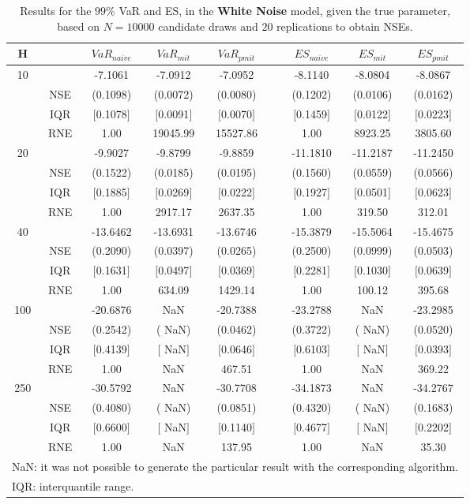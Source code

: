 \footnotesize{  
{ \renewcommand{\arraystretch}{1.3} 
\begin{longtable}{ccccccccc}  
\caption{Results for the $99\%$ VaR and ES, in the \textbf{White Noise} model, given the true parameter, based on $N=10000$ candidate draws and $20$ replications to obtain NSEs.} 
\label{tab:res_algos_WN_ML} \\ 
 H & & $VaR_{naive}$ & $VaR_{mit}$ & $VaR_{pmit}$ &  & $ES_{naive}$ & $ES_{mit}$ & $ES_{pmit}$ \\ \hline 
10 & & -7.1061 & -7.0912 & -7.0952 & & -8.1140 & -8.0804 & -8.0867  \\ 
  & NSE & (0.1098) & (0.0072) & (0.0080) & & (0.1202) & (0.0106) & (0.0162)   \\ 
 & IQR & $[$0.1078$]$ & $[$0.0091$]$ & $[$0.0070$]$ & & $[$0.1459$]$ & $[$0.0122$]$ & $[$0.0223$]$  \\  
  & RNE &   1.00 & 19045.99 & 15527.86 & &   1.00 & 8923.25 & 3805.60   \\ [1ex] 
20 & & -9.9027 & -9.8799 & -9.8859 & & -11.1810 & -11.2187 & -11.2450  \\ 
  & NSE & (0.1522) & (0.0185) & (0.0195) & & (0.1560) & (0.0559) & (0.0566)   \\ 
 & IQR & $[$0.1885$]$ & $[$0.0269$]$ & $[$0.0222$]$ & & $[$0.1927$]$ & $[$0.0501$]$ & $[$0.0623$]$  \\  
  & RNE &   1.00 & 2917.17 & 2637.35 & &   1.00 & 319.50 & 312.01   \\ [1ex] 
40 & & -13.6462 & -13.6931 & -13.6746 & & -15.3879 & -15.5064 & -15.4675  \\ 
  & NSE & (0.2090) & (0.0397) & (0.0265) & & (0.2500) & (0.0999) & (0.0503)   \\ 
 & IQR & $[$0.1631$]$ & $[$0.0497$]$ & $[$0.0369$]$ & & $[$0.2281$]$ & $[$0.1030$]$ & $[$0.0639$]$  \\  
  & RNE &   1.00 & 634.09 & 1429.14 & &   1.00 & 100.12 & 395.68   \\ [1ex] 
100 & & -20.6876 &    NaN & -20.7388 & & -23.2788 &    NaN & -23.2985  \\ 
  & NSE & (0.2542) & (   NaN) & (0.0462) & & (0.3722) & (   NaN) & (0.0520)   \\ 
 & IQR & $[$0.4139$]$ & $[$   NaN$]$ & $[$0.0646$]$ & & $[$0.6103$]$ & $[$   NaN$]$ & $[$0.0393$]$  \\  
  & RNE &   1.00 &    NaN & 467.51 & &   1.00 &    NaN & 369.22   \\ [1ex] 
250 & & -30.5792 &    NaN & -30.7708 & & -34.1873 &    NaN & -34.2767  \\ 
  & NSE & (0.4080) & (   NaN) & (0.0851) & & (0.4320) & (   NaN) & (0.1683)   \\ 
 & IQR & $[$0.6600$]$ & $[$   NaN$]$ & $[$0.1140$]$ & & $[$0.4677$]$ & $[$   NaN$]$ & $[$0.2202$]$  \\  
  & RNE &   1.00 &    NaN & 137.95 & &   1.00 &    NaN &  35.30   \\ [1ex] 
\hline 
  \multicolumn{9}{l}{\footnotesize{NaN: it was not possible to generate the particular result with the corresponding algorithm.}} \\ 
  \multicolumn{9}{l}{\footnotesize{IQR: interquantile range.}} \\ 
\end{longtable} 
} 
} 
